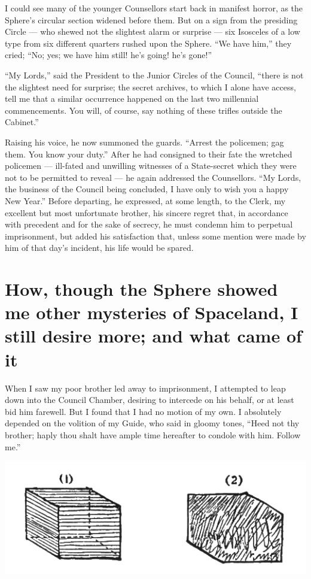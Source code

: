 \documentclass[10pt, kindle, oneside]{kindle}
\begin{document}
I could see many of the younger Counsellors start back in manifest horror, as
the Sphere's circular section widened before them. But on a sign from the
presiding Circle --- who shewed not the slightest alarm or surprise --- six
Isosceles of a low type from six different quarters rushed upon the Sphere.
``We have him,'' they cried; ``No; yes; we have him still! he's going! he's
gone!''

``My Lords,'' said the President to the Junior Circles of the Council, ``there is
not the slightest need for surprise; the secret archives, to which I alone
have access, tell me that a similar occurrence happened on the last two
millennial commencements. You will, of course, say nothing of these trifles
outside the Cabinet.''

Raising his voice, he now summoned the guards. ``Arrest the policemen; gag
them. You know your duty.'' After he had consigned to their fate the wretched
policemen --- ill-fated and unwilling witnesses of a State-secret which they
were not to be permitted to reveal --- he again addressed the Counsellors. ``My
Lords, the business of the Council being concluded, I have only to wish you a
happy New Year.'' Before departing, he expressed, at some length, to the Clerk,
my excellent but most unfortunate brother, his sincere regret that, in
accordance with precedent and for the sake of secrecy, he must condemn him to
perpetual imprisonment, but added his satisfaction that, unless some mention
were made by him of that day's incident, his life would be spared.


\chapter{How, though the Sphere showed me other mysteries of Spaceland, I still desire more; and what came of it} 


When I saw my poor brother led away to imprisonment, I attempted to leap down
into the Council Chamber, desiring to intercede on his behalf, or at least bid
him farewell. But I found that I had no motion of my own. I absolutely
depended on the volition of my Guide, who said in gloomy tones, ``Heed not thy
brother; haply thou shalt have ample time hereafter to condole with him.
Follow me.'' 
\begin{center}
    \includegraphics[trim=20mm 0mm 20mm 0mm,scale=0.5]{fig10}
\end{center}
\end{document}
